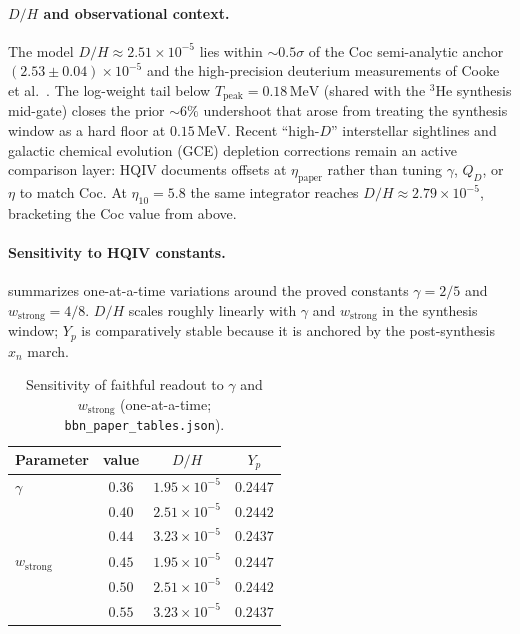 \documentclass[11pt]{amsart}
\newcommand{\etap}{\ensuremath{\eta_{\mathrm{paper}}}}
\begin{document}
\paragraph{$D/H$ and observational context.}
The model $D/H\approx 2.51\times10^{-5}$ lies within $\sim 0.5\sigma$ of the Coc
semi-analytic anchor $(2.53\pm0.04)\times10^{-5}$ and the high-precision
deuterium measurements of Cooke et al.\ \cite{cooke2014,cooke2018}.  The
log-weight tail below $T_{\mathrm{peak}}=0.18\,\mathrm{MeV}$ (shared with the
$^3\mathrm{He}$ synthesis mid-gate) closes the prior $\sim 6\%$ undershoot that arose from
treating the synthesis window as a hard floor at $0.15\,\mathrm{MeV}$.  Recent
``high-$D$'' interstellar sightlines and galactic chemical evolution (GCE)
depletion corrections remain an active comparison layer: HQIV documents offsets
at \etap{} rather than tuning $\gamma$, $Q_D$, or $\eta$ to match Coc.  At
$\eta_{10}=5.8$ the same integrator reaches $D/H\approx 2.79\times10^{-5}$,
bracketing the Coc value from above.

\paragraph{Sensitivity to HQIV constants.}
 summarizes one-at-a-time variations around the proved
constants $\gamma=2/5$ and $w_{\mathrm{strong}}=4/8$.  $D/H$ scales roughly
linearly with $\gamma$ and $w_{\mathrm{strong}}$ in the synthesis window;
$Y_p$ is comparatively stable because it is anchored by the post-synthesis
$x_n$ march.

\begin{table}[ht]
\centering
\caption{Sensitivity of faithful readout to $\gamma$ and $w_{\mathrm{strong}}$
(one-at-a-time; \texttt{bbn\_paper\_tables.json}).}
\label{tab:sensitivity}
\begin{tabular}{lccc}
\toprule
Parameter & value & $D/H$ & $Y_p$ \\
\midrule
$\gamma$ & $0.36$ & $1.95\times10^{-5}$ & $0.2447$ \\
         & $0.40$ & $2.51\times10^{-5}$ & $0.2442$ \\
         & $0.44$ & $3.23\times10^{-5}$ & $0.2437$ \\
$w_{\mathrm{strong}}$ & $0.45$ & $1.95\times10^{-5}$ & $0.2447$ \\
                      & $0.50$ & $2.51\times10^{-5}$ & $0.2442$ \\
                      & $0.55$ & $3.23\times10^{-5}$ & $0.2437$ \\
\bottomrule
\end{tabular}
\end{table}
\end{document}
